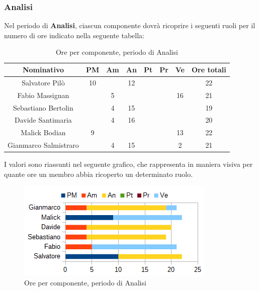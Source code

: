 		\subsubsection{Analisi}
		Nel periodo di \textbf{Analisi}, ciascun componente dovrà ricoprire i seguenti ruoli per il numero di ore indicato nella seguente tabella: \\
		\begin{table}[H]
		\centering
		\begin{tabular}{|c|c|c|c|c|c|c|c|}
			\hline
			\textbf{Nominativo}		& \textbf{PM}	& \textbf{Am}	& \textbf{An}	& \textbf{Pt}	& \textbf{Pr}	& \textbf{Ve}	& \textbf{Ore totali}     \\
			\hline
			Salvatore Pilò			& 10	& 		& 12	&		&		&		& 22 \\
			Fabio Massignan			&		& 5		&		&		&		& 16	& 21 \\
			Sebastiano Bertolin		&		& 4		& 15	&		&		&		& 19 \\
			Davide Santimaria		&		& 4		& 16	&		&		&		& 20 \\
			Malick Bodian			& 9		&		&		&		&		& 13	& 22 \\
			Gianmarco Salmistraro	&		& 4		& 15	&		&		& 2		& 21 \\
			\hline
		\end{tabular}
		\caption{Ore per componente, periodo di Analisi}
		\end{table}
		I valori sono riassunti nel seguente grafico, che rappresenta in maniera visiva per quante ore un membro abbia ricoperto un determinato ruolo. \\
		\begin{figure}[H]
			\centering
			\includegraphics[scale=1]{immagini/grafici/analisi-barra.png}
			\caption{Ore per componente, periodo di Analisi}
		\end{figure}
